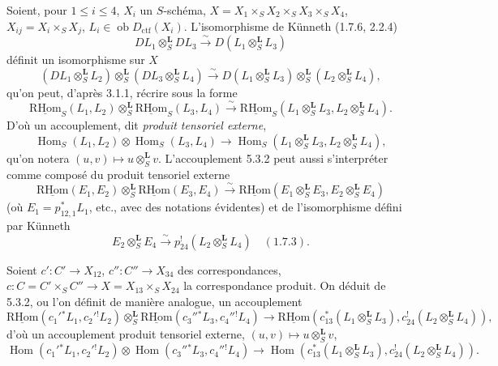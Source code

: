 \documentclass[11pt]{article}
\DeclareMathOperator{\Hom}{Hom}
\providecommand{\RHom}{\mathrm{RHom}}
\providecommand{\uRHom}{\underline{\RHom}}
\providecommand{\RHom}{\mathrm{RHom}}
\providecommand{\Hom}{\operatorname{Hom}}
\providecommand{\RHom}{\mathrm R\mathcal{H}om}
\providecommand{\RHom}{\mathrm{RHom}}
\providecommand{\Hom}{\operatorname{Hom}}
\begin{document}
Soient, pour $1\leq i\leq 4$, $X_i$ un $S$-schéma, $X=X_1\times_SX_2\times_SX_3\times_SX_4$, $X_{ij}=X_i\times_SX_j$, $L_i\in\operatorname{ob}D_{\mathrm{ctf}}(X_i)$. L'isomorphisme de Künneth (1.7.6, 2.2.4)
\[
DL_1\otimes_S^{\mathbf L}DL_3\xrightarrow{\sim}D(L_1\otimes_S^{\mathbf L}L_3)
\]
définit un isomorphisme sur $X$
\begin{equation}
\tag{5.3.1}
(DL_1\otimes_S^{\mathbf L}L_2)\otimes_S^{\mathbf L}(DL_3\otimes_S^{\mathbf L}L_4)
\xrightarrow{\sim}D(L_1\otimes_S^{\mathbf L}L_3)\otimes_S^{\mathbf L}(L_2\otimes_S^{\mathbf L}L_4),
\end{equation}
qu'on peut, d'après 3.1.1, récrire sous la forme
\begin{equation}
\tag{5.3.2}
\uRHom_S(L_1,L_2)\otimes_S^{\mathbf L}\uRHom_S(L_3,L_4)
\xrightarrow{\sim}\uRHom_S(L_1\otimes_S^{\mathbf L}L_3,L_2\otimes_S^{\mathbf L}L_4).
\end{equation}
D'où un accouplement, dit \emph{produit tensoriel externe},
\begin{equation}
\tag{5.3.3}
\Hom_S(L_1,L_2)\otimes\Hom_S(L_3,L_4)
\longrightarrow\Hom_S(L_1\otimes_S^{\mathbf L}L_3,L_2\otimes_S^{\mathbf L}L_4),
\end{equation}
qu'on notera $(u,v)\mapsto u\otimes_S^{\mathbf L}v$. L'accouplement 5.3.2 peut aussi s'interpréter comme composé du produit tensoriel externe
\[
\uRHom(E_1,E_2)\otimes_S^{\mathbf L}\uRHom(E_3,E_4)
\xrightarrow{\sim}\uRHom(E_1\otimes_S^{\mathbf L}E_3,E_2\otimes_S^{\mathbf L}E_4)
\]
(où $E_1=p_{12,1}^*L_1$, etc., avec des notations évidentes) et de l'isomorphisme défini par Künneth
\[
E_2\otimes_S^{\mathbf L}E_4\xrightarrow{\sim}p_{24}^!(L_2\otimes_S^{\mathbf L}L_4)\quad (1.7.3).
\]

Soient $c':C'\to X_{12}$, $c'':C''\to X_{34}$ des correspondances, $c:C=C'\times_SC''\to X=X_{13}\times_SX_{24}$ la correspondance produit. On déduit de 5.3.2, ou l'on définit de manière analogue, un accouplement
\begin{equation}
\tag{5.3.4}
\uRHom(c_1'{}^*L_1,c_2'{}^!L_2)\otimes_S^{\mathbf L}\uRHom(c_3''{}^*L_3,c_4''{}^!L_4)
\longrightarrow\uRHom(c_{13}^*(L_1\otimes_S^{\mathbf L}L_3),c_{24}^!(L_2\otimes_S^{\mathbf L}L_4)),
\end{equation}
d'où un accouplement produit tensoriel externe, $(u,v)\mapsto u\otimes_S^{\mathbf L}v$,
\begin{equation}
\tag{5.3.5}
\Hom(c_1'{}^*L_1,c_2'{}^!L_2)\otimes\Hom(c_3''{}^*L_3,c_4''{}^!L_4)
\longrightarrow\Hom(c_{13}^*(L_1\otimes_S^{\mathbf L}L_3),c_{24}^!(L_2\otimes_S^{\mathbf L}L_4)).
\end{equation}
\end{document}
